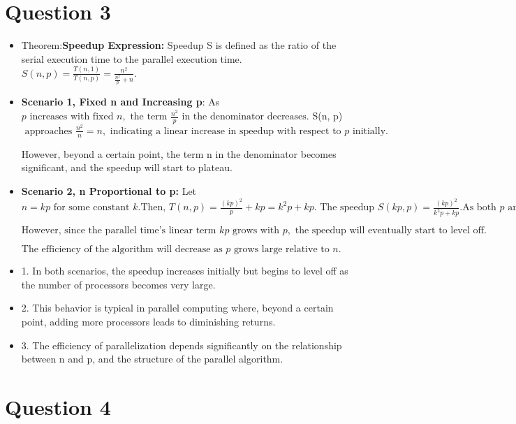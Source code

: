 \documentclass{article}
\begin{document}
\section{Question 3}
\begin{itemize}
    \item Theorem:\textbf{Speedup Expression:} Speedup S is defined as the ratio of the serial execution time to the parallel execution time.
    $S(n, p) = \frac{T(n, 1)}{T(n, p)} = \frac{n^2}{\frac{n^2}{p} + n}.$
\item %
\textbf{Scenario 1, Fixed n and Increasing p}: As $ p \text{ increases with fixed } n, \text{ the term } \frac{n^2}{p} \text{ in the denominator decreases.}$
 S(n, p) $\text{ approaches } \frac{n^2}{n} = n, \text{ indicating a linear increase in speedup with respect to } p \text{ initially.}$\par

However, beyond a certain point, the term n in the denominator becomes significant, and the speedup will start to plateau.
\item %
\textbf{Scenario 2, n Proportional to p:} Let $n = kp \text{ for some constant } k.
\text{Then, } T(n, p) = \frac{(kp)^2}{p} + kp = k^2p + kp.
\text{ The speedup } S(kp, p) = \frac{(kp)^2}{k^2p + kp}.
\text{As both } p \text{ and } n \text{ increase, the speedup will initially increase.}$\par
$\text{However, since the parallel time's linear term } kp \text{ grows with } p, \text{ the speedup will eventually start to level off.}$\par
$\text{The efficiency of the algorithm will decrease as } p \text{ grows large relative to } n.$

\item 1. In both scenarios, the speedup increases initially but begins to level off as the number of processors becomes very large.
\item 2. This behavior is typical in parallel computing where, beyond a certain point, adding more processors leads to diminishing returns.
\item 3. The efficiency of parallelization depends significantly on the relationship between n and p, and the structure of the parallel algorithm.
\end{itemize}
\section{Question 4}
\end{document}
